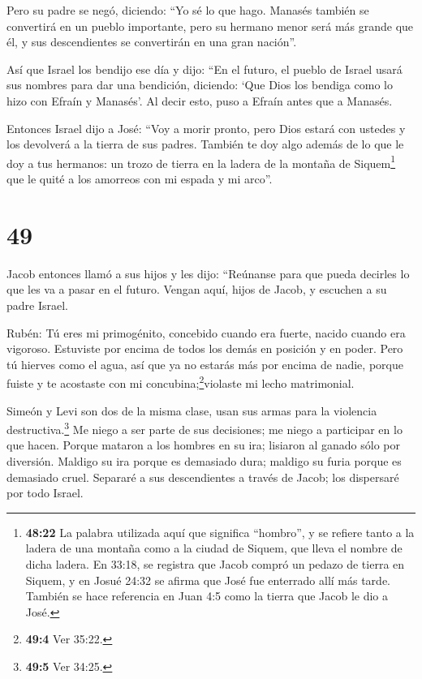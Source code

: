  Pero su padre se negó, diciendo: ``Yo sé lo que hago.
Manasés también se convertirá en un pueblo importante, pero su hermano
menor será más grande que él, y sus descendientes se convertirán en una
gran nación''.

 Así que Israel los bendijo ese día y dijo: ``En el futuro,
el pueblo de Israel usará sus nombres para dar una bendición, diciendo:
`Que Dios los bendiga como lo hizo con Efraín y Manasés'. Al decir esto,
puso a Efraín antes que a Manasés.

 Entonces Israel dijo a José: ``Voy a morir pronto, pero
Dios estará con ustedes y los devolverá a la tierra de sus padres.
 También te doy algo además de lo que le doy a tus
hermanos: un trozo de tierra en la ladera de la montaña de
Siquem\footnote{\textbf{48:22} La palabra utilizada aquí que significa
  ``hombro'', y se refiere tanto a la ladera de una montaña como a la
  ciudad de Siquem, que lleva el nombre de dicha ladera. En 33:18, se
  registra que Jacob compró un pedazo de tierra en Siquem, y en Josué
  24:32 se afirma que José fue enterrado allí más tarde. También se hace
  referencia en Juan 4:5 como la tierra que Jacob le dio a José.} que le
quité a los amorreos con mi espada y mi arco''.

\hypertarget{section-48}{%
\section{49}\label{section-48}}

 Jacob entonces llamó a sus hijos y les dijo: ``Reúnanse
para que pueda decirles lo que les va a pasar en el futuro. 
Vengan aquí, hijos de Jacob, y escuchen a su padre Israel.

 Rubén: Tú eres mi primogénito, concebido cuando era fuerte,
nacido cuando era vigoroso. Estuviste por encima de todos los demás en
posición y en poder.  Pero tú hierves como el agua, así que
ya no estarás más por encima de nadie, porque fuiste y te acostaste con
mi concubina;\footnote{\textbf{49:4} Ver 35:22.}violaste mi lecho
matrimonial.

 Simeón y Levi son dos de la misma clase, usan sus armas
para la violencia destructiva.\footnote{\textbf{49:5} Ver 34:25.}
 Me niego a ser parte de sus decisiones; me niego a
participar en lo que hacen. Porque mataron a los hombres en su ira;
lisiaron al ganado sólo por diversión.  Maldigo su ira
porque es demasiado dura; maldigo su furia porque es demasiado cruel.
Separaré a sus descendientes a través de Jacob; los dispersaré por todo
Israel.

